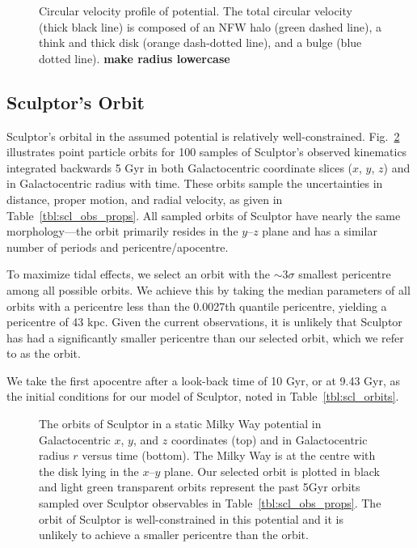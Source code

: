 \begin{figure}
\centering
{}
\caption[Circular velocity of potential]{Circular velocity profile of
\citet{EP2020} potential. The total circular velocity (thick black line)
is composed of an NFW halo (green dashed line), a think and thick
\citet{miyamoto+nagai1975} disk (orange dash-dotted line), and a
\citet{hernquist1990} bulge (blue dotted line). \textbf{make radius
lowercase}}\label{fig:v_circ_potential}
\end{figure}

\subsection{Sculptor's Orbit}\label{sculptors-orbit}

Sculptor's orbital in the assumed potential is relatively
well-constrained. Fig.~\ref{fig:scl_orbits} illustrates point particle
orbits for 100 samples of Sculptor's observed kinematics integrated
backwards 5 Gyr in both Galactocentric coordinate slices (\(x\), \(y\),
\(z\)) and in Galactocentric radius with time. These orbits sample the
uncertainties in distance, proper motion, and radial velocity, as given
in Table~\ref{tbl:scl_obs_props}. All sampled orbits of Sculptor have
nearly the same morphology---the orbit primarily resides in the
\(y\)--\(z\) plane and has a similar number of periods and
pericentre/apocentre.

To maximize tidal effects, we select an orbit with the \(\sim 3\sigma\)
smallest pericentre among all possible orbits. We achieve this by taking
the median parameters of all orbits with a pericentre less than the
0.0027th quantile pericentre, yielding a pericentre of 43 kpc. Given the
current observations, it is unlikely that Sculptor has had a
significantly smaller pericentre than our selected orbit, which we refer
to as the \smallperi{} orbit.

We take the first apocentre after a look-back time of 10 Gyr, or at 9.43
Gyr, as the initial conditions for our model of Sculptor, noted in
Table~\ref{tbl:scl_orbits}.

\begin{figure}
\centering
{}
\caption[Sculptor Orbits]{The orbits of Sculptor in a static Milky Way
potential in Galactocentric \(x\), \(y\), and \(z\) coordinates (top)
and in Galactocentric radius \(r\) versus time (bottom). The Milky Way
is at the centre with the disk lying in the \(x\)--\(y\) plane. Our
selected \smallperi{} orbit is plotted in black and light green
transparent orbits represent the past 5Gyr orbits sampled over Sculptor
observables in Table~\ref{tbl:scl_obs_props}. The orbit of Sculptor is
well-constrained in this potential and it is unlikely to achieve a
smaller pericentre than the \smallperi{} orbit.}\label{fig:scl_orbits}
\end{figure}

